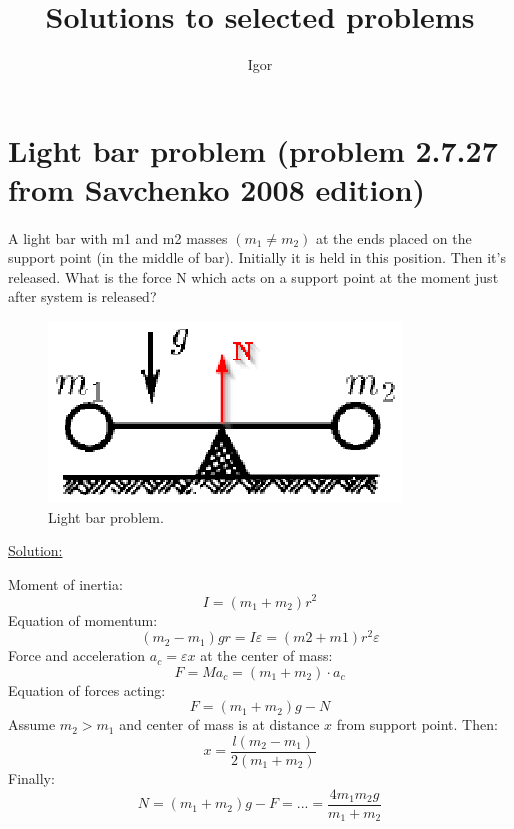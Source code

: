 \documentclass[12pt, letterpaper]{article}
\begin{document}
\title{Solutions to selected problems}
\author{Igor}
\maketitle

\tableofcontents
\newpage

\section{Light bar problem (problem 2.7.27 from Savchenko 2008 edition)}
\paragraph{}
A light bar with m1 and m2 masses $(m_1 \neq m_2)$ at the ends placed on the support point (in the middle of  bar). Initially it is held in this position. Then it's released.
What is the force N which acts on a support point at the moment just after system is released?

\begin{figure}[!htbp]
	\centering
	\includegraphics[totalheight=2cm]{./images/LightBarProblem.eps}
	\caption{Light bar problem.}
	\label{fig:verticalcell}
\end{figure}

\noindent\underline{\large Solution:}
\vspace{0.2in}
\begin{addmargin}[1em]{2em}
Moment of inertia:
$$I=(m_1+m_2)r^2$$
Equation of momentum:
$$(m_2-m_1)gr=I\varepsilon=(m2+m1)r^2\varepsilon$$
Force and acceleration $a_c=\varepsilon x$ at the center of mass:
$$F=Ma_c=(m_1+m_2) \cdot a_c$$
Equation of forces acting:
$$F=(m_1+m_2)g-N$$
Assume $m_2>m_1$ and center of mass is at distance $x$ from support point. Then: $$x=\frac {l(m_2-m_1)} {2(m_1+m_2)}$$
Finally: $$N=(m_1+m_2)g-F=...=\frac {4m_1m_2g} {m_1+m_2}$$
\end{addmargin}
\end{document}

